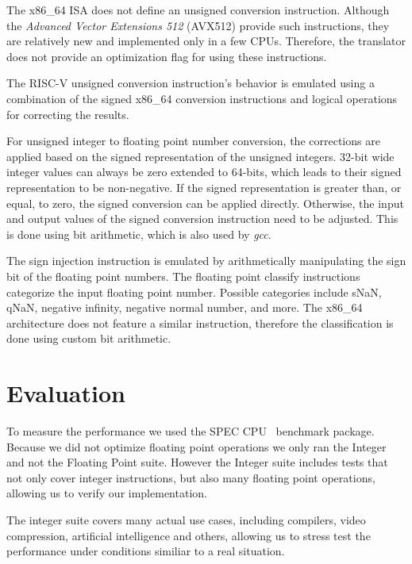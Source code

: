 \documentclass[course=eragp]{aspdoc}
\begin{document}
The x86\_64 ISA does not define an unsigned conversion instruction. Although the \textit{Advanced
Vector Extensions 512} (AVX512) provide such instructions, they are relatively new and implemented
only in a few CPUs. Therefore, the translator does not provide an optimization flag for using these
instructions. 

\par

The RISC-V unsigned conversion instruction's behavior is emulated using a combination of the
signed x86\_64 conversion instructions and logical operations for correcting the results.

For unsigned integer to floating point number conversion, the corrections are applied based
on the signed representation of the unsigned integers. 32-bit wide integer values can always be zero
extended to 64-bits, which leads to their signed representation to be non-negative. If the signed
representation is greater than, or equal, to zero, the signed conversion can be applied directly. 
Otherwise, the input and output values of the signed conversion
instruction need to be adjusted. This is done using bit arithmetic, which is also used by \textit{gcc}.

\par
The sign injection instruction is emulated by arithmetically manipulating the sign bit of the
floating point numbers. The floating point classify instructions categorize the input floating point
number. Possible categories include sNaN, qNaN, negative infinity, negative normal number, and more.
The x86\_64 architecture does not feature a similar instruction, therefore the classification is
done using custom bit arithmetic.

\section{Evaluation}\label{sec:evaluation}

To measure the performance we used the SPEC CPU~\cite{spec_cpu_2017} benchmark package.
Because we did not optimize floating point operations we only ran the Integer and not the Floating Point suite.
However the Integer suite includes tests that not only cover integer instructions, but also many floating point operations, allowing us to verify our implementation.

\par

The integer suite covers many actual use cases, including compilers, video compression, artificial intelligence and others, allowing us to stress
test the performance under conditions similiar to a real situation.
\end{document}
